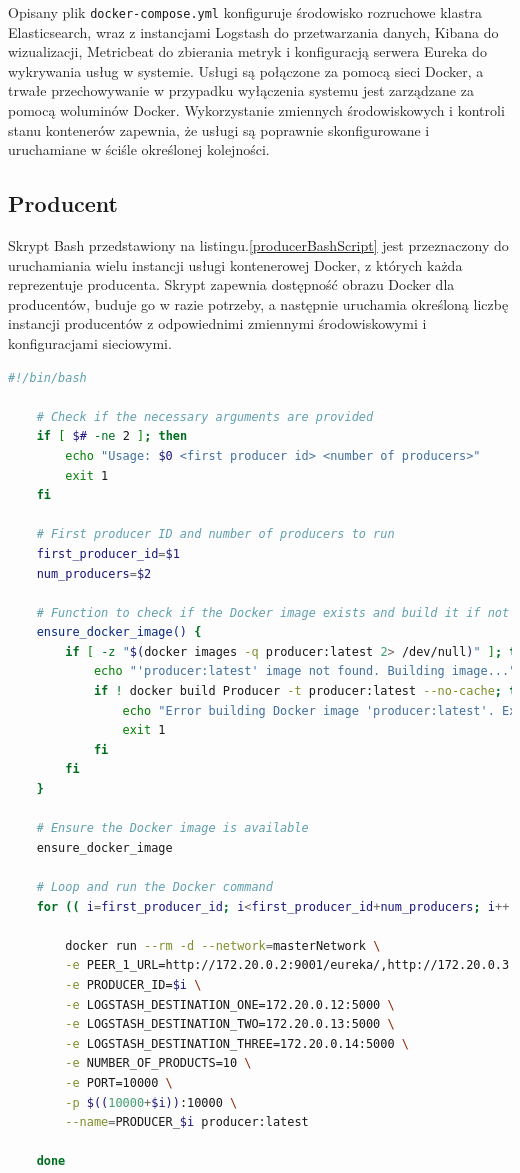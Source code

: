 Opisany plik \verb|docker-compose.yml| konfiguruje środowisko rozruchowe klastra Elasticsearch, wraz z instancjami Logstash do przetwarzania danych, Kibana do wizualizacji, Metricbeat do zbierania metryk i konfiguracją serwera Eureka do wykrywania usług w systemie. Usługi są połączone za pomocą sieci Docker, a trwałe przechowywanie w przypadku wyłączenia systemu jest zarządzane za pomocą woluminów Docker. Wykorzystanie zmiennych środowiskowych i kontroli stanu kontenerów zapewnia, że usługi są poprawnie skonfigurowane i uruchamiane w ściśle określonej kolejności.

\subsection{Producent}

Skrypt Bash przedstawiony na listingu.\ref{producerBashScript} jest przeznaczony do uruchamiania wielu instancji usługi kontenerowej Docker, z których każda reprezentuje producenta. Skrypt zapewnia dostępność obrazu Docker dla producentów, buduje go w razie potrzeby, a następnie uruchamia określoną liczbę instancji producentów z odpowiednimi zmiennymi środowiskowymi i konfiguracjami sieciowymi.

\begin{lstlisting}[language=bash,caption=Kod skryptu producers.sh,label=producerBashScript]
    #!/bin/bash

    # Check if the necessary arguments are provided
    if [ $# -ne 2 ]; then
        echo "Usage: $0 <first producer id> <number of producers>"
        exit 1
    fi
    
    # First producer ID and number of producers to run
    first_producer_id=$1
    num_producers=$2
    
    # Function to check if the Docker image exists and build it if not
    ensure_docker_image() {
        if [ -z "$(docker images -q producer:latest 2> /dev/null)" ]; then
            echo "'producer:latest' image not found. Building image..."
            if ! docker build Producer -t producer:latest --no-cache; then
                echo "Error building Docker image 'producer:latest'. Exiting."
                exit 1
            fi
        fi
    }
    
    # Ensure the Docker image is available
    ensure_docker_image
    
    # Loop and run the Docker command
    for (( i=first_producer_id; i<first_producer_id+num_producers; i++ )); do
    
        docker run --rm -d --network=masterNetwork \
        -e PEER_1_URL=http://172.20.0.2:9001/eureka/,http://172.20.0.3:9002/eureka/,http://172.20.0.4:9003/eureka/ \
        -e PRODUCER_ID=$i \
        -e LOGSTASH_DESTINATION_ONE=172.20.0.12:5000 \
        -e LOGSTASH_DESTINATION_TWO=172.20.0.13:5000 \
        -e LOGSTASH_DESTINATION_THREE=172.20.0.14:5000 \
        -e NUMBER_OF_PRODUCTS=10 \
        -e PORT=10000 \
        -p $((10000+$i)):10000 \
        --name=PRODUCER_$i producer:latest
    
    done

\end{lstlisting}

